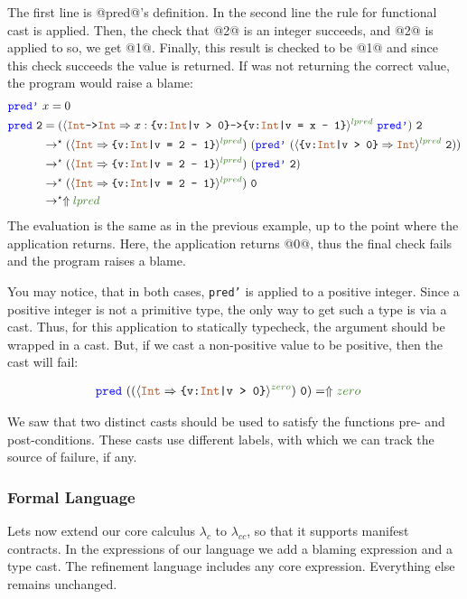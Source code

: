 The first line is @pred@'s definition. In the second line the rule for functional cast is applied.
Then, the check that @2@ is an integer succeeds, and @2@ is applied to \prednamep
so, we get @1@.
Finally, this result is checked to be @1@ and since this check succeeds the value is returned.
%
If \prednamep was not returning the correct value, the program would raise a blame:
\begin{align*}
\prednamep\ & x= 0 \\
\predname\ \texttt{2} &=
(\ecast{\tyint \texttt{->} \tyint}{x:\ttpos \texttt{->} \ttpred{x}}{lpred} \ \prednamep)\ \texttt{2} \\
&\rightarrow^\star (\ecast{\tyint}{\ttpred{2}}{lpred}) \ (\prednamep\ (\ecast{\ttpos}{\tyint}{lpred} \ \texttt{2})) \\ 
&\rightarrow^\star (\ecast{\tyint}{\ttpred{2}}{lpred}) \ (\prednamep\ \texttt{2}) \\ 
&\rightarrow^\star (\ecast{\tyint}{\ttpred{2}}{lpred}) \ \texttt{0} \\ 
&\rightarrow^\star \elabel{lpred} \\ 
\end{align*}
The evaluation is the same as in the previous example, 
up to the point where the \prednamep application returns.
Here, the application returns @0@, thus the final check fails 
and the program raises a blame.

You may notice, that in both cases, \texttt{pred'} is applied to a 
positive integer.
Since a positive integer is not a primitive type, 
the only way to get such a type is via a cast.
Thus, for this application to statically typecheck, the argument should 
be wrapped in a cast.
But, if we cast a non-positive value to be positive,
then the cast will fail:

\begin{align*}
\predname \ ((\ecast{\tyint}{\ttpos}{zero})\ \texttt{0}) &= \elabel{zero}
\end{align*}

We saw that two distinct casts should be used to satisfy the functions pre- and post-conditions.
These casts use different labels, with which we can track the source of failure, if any.

\subsubsection{Formal Language}
Lets now extend our core calculus $\lambda_c$ to $\lambda_{cc}$,
so that it supports manifest contracts.
%
In the expressions of our language we add a blaming expression
and a type cast.
The refinement language includes any core expression.
Everything else remains unchanged.


